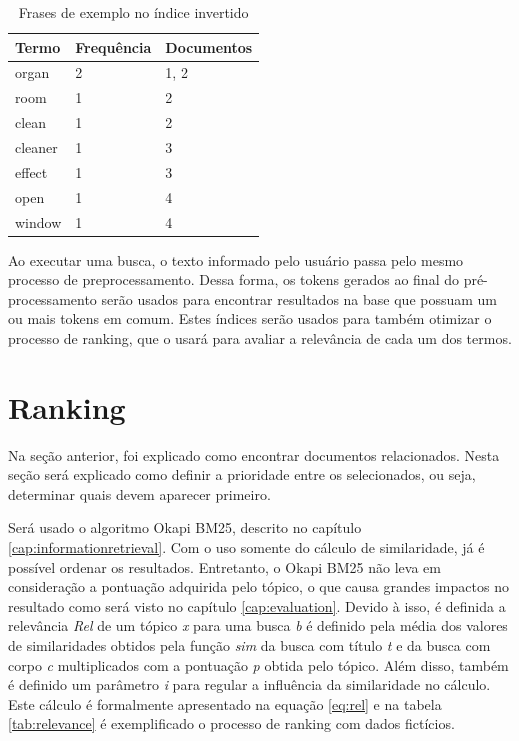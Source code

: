 \begin{table}[htb]
	\centering
    \def\arraystretch{1.2} 
    \begin{tabular}{|l|l|l|}
        \hline
        \textbf{Termo} & \textbf{Frequência} & \textbf{Documentos} \\ \hline
        organ & 2  & 1, 2            \\ \hline
        room & 1  & 2 \\ \hline
        clean & 1  & 2                              \\ \hline
        cleaner & 1  & 3                             \\ \hline
        effect & 1  & 3                             \\ \hline
        open & 1  & 4                             \\ \hline
        window & 1  & 4                             \\ \hline
    \end{tabular}
	\caption{Frases de exemplo no índice invertido}
    \label{tab:invertedindex}
\end{table}
Ao executar uma busca, o texto informado pelo usuário passa pelo mesmo processo de preprocessamento. Dessa forma, os tokens gerados ao final do pré-processamento serão usados para encontrar resultados na base que possuam um ou mais tokens em comum. Estes índices serão usados para também otimizar o processo de ranking, que o usará para avaliar a relevância de cada um dos termos.

\section{Ranking}
Na seção anterior, foi explicado como encontrar documentos relacionados. Nesta seção será explicado como definir a prioridade entre os selecionados, ou seja, determinar quais devem aparecer primeiro.

Será usado o algoritmo Okapi BM25, descrito no capítulo \ref{cap:informationretrieval}. Com o uso somente do cálculo de similaridade, já é possível ordenar os resultados. Entretanto, o Okapi BM25 não leva em consideração a pontuação adquirida pelo tópico, o que causa grandes impactos no resultado como será visto no capítulo \ref{cap:evaluation}. Devido à isso, é definida a relevância \textit{Rel} de um tópico \textit{x} para uma busca \textit{b} é definido pela média dos valores de similaridades obtidos pela função \textit{sim} da busca com título \textit{t} e da busca com corpo \textit{c} multiplicados com a pontuação \textit{p} obtida pelo tópico. Além disso, também é definido um parâmetro \textit{i} para regular a influência da similaridade no cálculo. Este cálculo é formalmente apresentado na equação \ref{eq:rel} e na tabela \ref{tab:relevance} é exemplificado o processo de ranking com dados fictícios.

